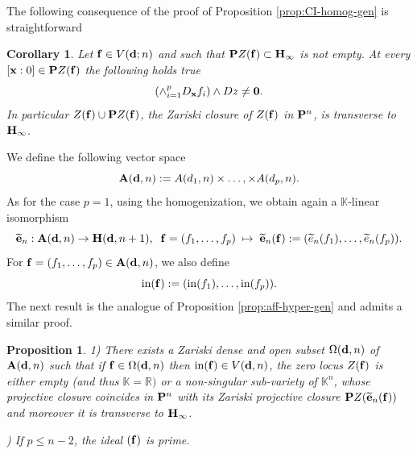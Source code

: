 \documentclass[11pt]{amsart}
\newcommand\tcbl[1]{\textcolor{blue}{#1}}
\newtheorem{corollary}[theorem]{Corollary}
\newtheorem{proposition}[theorem]{Proposition}
\newcommand{\field}[1]{\mathbb{#1}}
\newcommand{\C}{\field{C}}
\newcommand{\K}{\field{K}}
\newcommand{\R}{\field{R}}
\newcommand{\wt}[1]{\widetilde{#1}}
\newcommand{\bA}{{\bf A}}
\newcommand{\bbo}{{\bf 0}}
\newcommand{\bd}{{\bf d}}
\newcommand{\be}{{\bf e}}
\newcommand{\bbf}{{\bf f}}
\newcommand{\bH}{{\bf H}}
\newcommand{\bP}{{\bf P}}
\newcommand{\bx}{{\bf x}}
\newcommand{\ini}{{\rm in}}
\newcommand{\Kn}{{\K^n}}
\newcommand{\Omg}{\Omega}
\numberwithin{equation}{section}
\numberwithin{equation}{section}
\begin{document}
%
%
The following 
consequence of the proof of Proposition \ref{prop:CI-homog-gen} is 
straightforward
%
%
\begin{corollary}\label{cor:CI-homog-gen}
Let $\bbf \in V(\bd;n)$ and such that $\bP Z(\bbf)\subset \bH_\infty$ is not 
empty. At every $[\bx:0] \in \bP Z(\bbf)$ the following holds true 
$$
(\wedge_{i=1}^p D_\bx f_i) \wedge Dz \neq \bbo.
$$
In particular $Z(\bbf)\cup \bP Z(\bbf)$, the Zariski closure of $Z(\bbf)$ in 
$\bP^n$, is transverse to $\bH_\infty$.
\end{corollary}
%
%

\bigskip
We define the following vector space
$$
\bA(\bd,n) := A(d_1,n)\times\ldots,\times A(d_p,n).
$$
As for the case $p=1$, using the homogenization, we obtain again a
$\K$-linear isomorphism
$$
\wt{\be}_n : \bA(\bd,n) \to \bH(\bd,n+1),\;\;
\bbf = (f_1,\ldots,f_p) \; \mapsto \; \wt{\be}_n(\bbf) := ( \wt{e}_n(f_1),\ldots, 
\wt{e}_n(f_p)).
$$
For $\bbf = (f_1,\ldots,f_p) \in \bA(\bd,n)$, we also define
$$
\ini(\bbf) := (\ini(f_1),\ldots,\ini(f_p)).
$$
The next result is the analogue of Proposition \ref{prop:aff-hyper-gen}
and admits a similar proof.
%
%
\begin{proposition}\label{prop:aff-CI-gen}
1) There exists a Zariski dense and open subset $\Omg(\bd,n)$ of $\bA(\bd,n)$ 
such 
that if  $\bbf \in \Omg(\bd,n)$ then $\ini(\bbf) \in V(\bd,n)$, the zero 
locus $Z(\bbf)$ is either empty (and 
thus $\K =\R)$ or a non-singular sub-variety of $\Kn$, whose projective 
closure coincides in $\bP^n$ with its Zariski projective closure 
$\bP Z(\wt{\be}_n(\bbf))$ and moreover it is transverse to $\bH_\infty$.

\smallskip{}) If $p\leq n-2$, the ideal $(\bbf)$ is prime.
\end{proposition}
%
%
%
%
\end{document}
